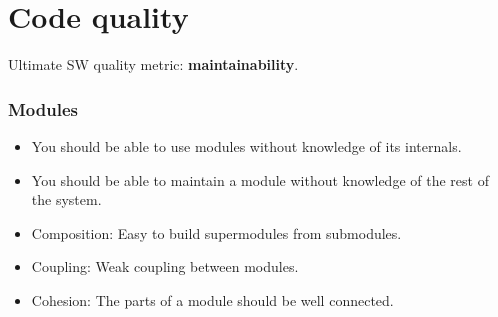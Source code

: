 \part{Code quality}
Ultimate SW quality metric: \textbf{maintainability}. 
\section{Modules}
\begin{itemize}
    \item You should be able to use modules without knowledge of its internals.
    \item You should be able to maintain a module without knowledge of the rest of the system.
    \item Composition: Easy to build supermodules from submodules.
    \item Coupling: Weak coupling between modules.
    \item Cohesion: The parts of a module should be well connected. 
\end{itemize}